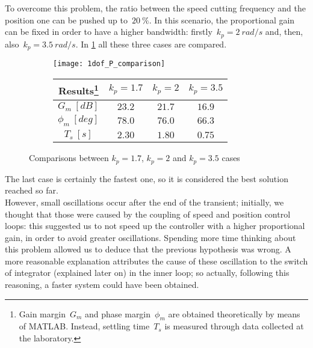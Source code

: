 To overcome this problem, the ratio between the speed cutting frequency and the position one can be pushed up to~$20\ \%$. In this scenario, the proportional gain can be fixed in order to have a higher bandwidth: firstly~$k_p = 2\ rad/s$ and, then, also~$k_p = 3.5\ rad/s$.
In \cref{fig:P1dof_step} all these three cases are compared.
\begin{figure*}[h]
	\centering
	\begin{subfigure}{0.45\columnwidth}
		\texttt{[image: 1dof\_P\_comparison]}
		\label{fig:P1dof_step}
	\end{subfigure}
	\begin{subfigure}{0.45\columnwidth}
		\begin{tabular}{|c|ccc|}
			\hline
			Results\footnote{Gain margin~$G_m$ and phase margin~$\phi_m$ are obtained theoretically by means of MATLAB. Instead, settling time~$T_s$ is measured through data collected at the laboratory.} & $k_p=1.7$ & $k_p=2$ & $k_p=3.5$ \\
			\hline
			$G_m\ [dB]$ & $23.2$ & $21.7$ & $16.9$ \\
			$\phi_m\ [deg]$ & $78.0$ & $76.0$ & $66.3$ \\
			\hline
			$T_s\ [s]$ & $2.30$ & $1.80$ & $0.75$ \\
			\hline
		\end{tabular}
	\end{subfigure}
	\caption{Comparisons between $k_p=1.7$, $k_p=2$ and $k_p=3.5$ cases}
	\label{fig:Bode and Step P 1dof comparison}
\end{figure*}
The last case is certainly the fastest one, so it is considered the best solution reached so far. \\
However, small oscillations occur after the end of the transient; initially, we thought that those were caused by the coupling of speed and position control loops: this suggested us to not speed up the controller with a higher proportional gain, in order to avoid greater oscillations. Spending more time thinking about this problem allowed us to deduce that the previous hypothesis was wrong. A more reasonable explanation attributes the cause of these oscillation to the switch of integrator (explained later on) in the inner loop; so actually, following this reasoning, a faster system could have been obtained. \\

